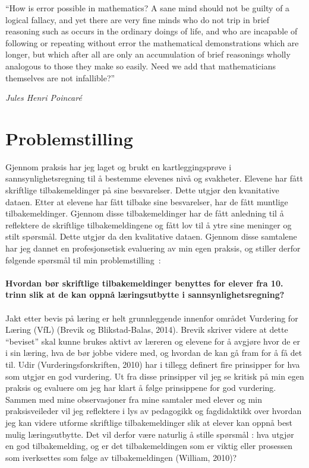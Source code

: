 \documentclass[main.tex]{subfiles}
\begin{document}
\setlength{\epigraphwidth}{0.8\textwidth}
\epigraph{``How is error possible in mathematics? 
A sane mind should not be guilty of a logical fallacy, 
and yet there are very fine minds who do not trip in brief reasoning 
such as occurs in the ordinary doings of life, 
and who are incapable of following or repeating without error 
the mathematical demonstrations which are longer, 
but which after all are only an accumulation of brief reasonings 
wholly analogous to those they make so easily. 
Need we add that mathematicians themselves are not infallible?''}
{\textit{Jules Henri Poincaré}}

\section*{Problemstilling}
Gjennom praksis har jeg laget og brukt en kartleggingsprøve i sannsynlighetsregning til å bestemme
elevenes nivå og svakheter. Elevene har fått skriftlige tilbakemeldinger på sine besvarelser.
Dette utgjør den kvanitative dataen. Etter at elevene har fått tilbake sine besvarelser, har de fått
muntlige tilbakemeldinger. Gjennom disse tilbakemeldinger har de fått anledning til å reflektere
de skriftlige tilbakemeldingene og fått lov til å ytre sine meninger og stilt spørsmål. Dette utgjør
da den kvalitative dataen. Gjennom disse samtalene har jeg dannet en profesjonsetisk
evaluering av min egen praksis, og stiller derfor følgende spørsmål til min \mbox{problemstilling :}
\\
\\
\textbf{Hvordan bør skriftlige tilbakemeldinger benyttes for elever fra 10.
trinn slik at de kan oppnå læringsutbytte i sannsynlighetsregning?}
\\
\\
Jakt etter bevis på læring er helt grunnleggende innenfor området Vurdering for Læring (VfL)
(Brevik og Blikstad-Balas, 2014). Brevik skriver videre at dette “beviset” skal kunne brukes aktivt
av læreren og elevene for å avgjøre hvor de er i sin læring, hva de bør jobbe videre med, og
hvordan de kan gå fram for å få det til. Udir (Vurderingsforskriften, 2010) har i tillegg definert fire
prinsipper for hva som utgjør en god vurdering. Ut fra disse prinsipper vil jeg se kritisk på min
egen praksis og evaluere om jeg har klart å følge prinsippene for god vurdering. Sammen med
mine observasjoner fra mine samtaler med elever og min praksisveileder vil jeg reflektere i lys
av pedagogikk og fagdidaktikk over hvordan jeg kan videre utforme skriftlige tilbakemeldinger
slik at elever kan oppnå best mulig læringsutbytte. Det vil derfor være naturlig å stille spørsmål :
hva utgjør en god tilbakemelding, og er det tilbakemeldingen som er viktig eller prosessen som
iverksettes som følge av tilbakemeldingen (William, 2010)? 
\end{document}
